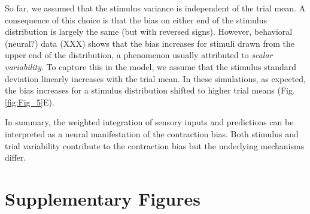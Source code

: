 \documentclass[10pt,a4paper]{article}
\begin{document}
So far, we assumed that the stimulus variance is independent of the trial mean. A consequence of this choice is that the bias on either end of the stimulus distribution is largely the same (but with reversed signs). However, behavioral (neural?) data (XXX) shows that the bias increases for stimuli drawn from the upper end of the distribution, a phenomenon usually attributed to \textit{scalar variability}. To capture this in the model, we assume that the stimulus standard deviation linearly increases with the trial mean. In these simulations, as expected, the bias increases for a stimulus distribution shifted to higher trial means (Fig. \ref{fig:Fig_5}E).

In summary, the weighted integration of sensory inputs and predictions can be interpreted as a neural manifestation of the contraction bias. Both stimulus and trial variability contribute to the contraction bias but the underlying mechanisms differ. 


\section*{Supplementary Figures}
\setcounter{figure}{0}
\renewcommand{\thefigure}{S\arabic{figure}}
\end{document}
